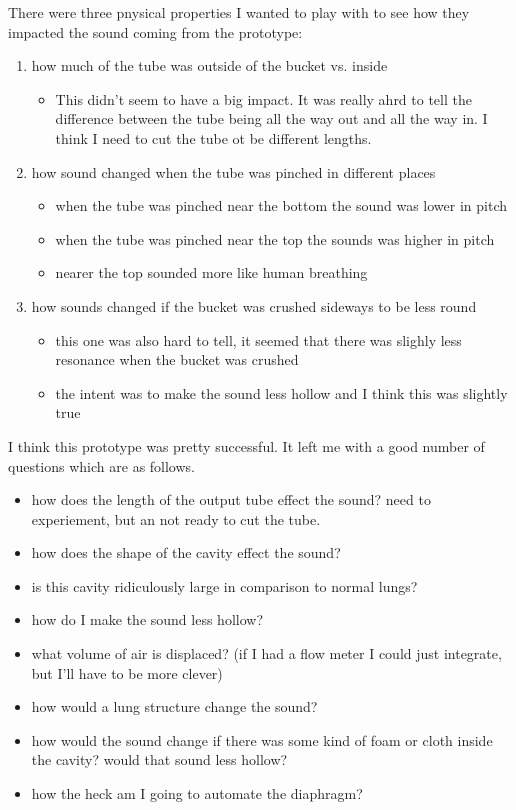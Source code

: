 \documentclass[11pt]{report}
\begin{document}
There were three pnysical properties I wanted to play with to see how they impacted the sound coming from the prototype:
\begin{enumerate}
\item
how much of the tube was outside of the bucket vs. inside
\begin{itemize}
\item
This didn't seem to have a big impact. It was really ahrd to tell the difference between the tube being all the way out and all the way in. I think I need to cut the tube ot be different lengths.
\end{itemize}
\item
how sound changed when the tube was pinched in different places
\begin{itemize}
  \item
    when the tube was pinched near the bottom the sound was lower in pitch
  \item
    when the tube was pinched near the top the sounds was higher in pitch
  \item
    nearer the top sounded more like human breathing
\end{itemize}
\item
how sounds changed if the bucket was crushed sideways to be less round
\begin{itemize}
  \item
    this one was also hard to tell, it seemed that there was slighly less resonance when the bucket was crushed
  \item
    the intent was to make the sound less hollow and I think this was slightly true
\end{itemize}

\end{enumerate}

\vspace{1cm}
I think this prototype was pretty successful. It left me with a good number of questions which are as follows.
\begin{itemize}
\item
  how does the length of the output tube effect the sound? need to experiement, but an not ready to cut the tube.
\item
  how does the shape of the cavity effect the sound?
\item
  is this cavity ridiculously large in comparison to normal lungs?
\item
  how do I make the sound less hollow?
\item
  what volume of air is displaced? (if I had a flow meter I could just integrate, but I'll have to be more clever)
\item
  how would a lung structure change the sound?
\item
  how would the sound change if there was some kind of foam or cloth inside the cavity? would that sound less hollow?
\item
  how the heck am I going to automate the diaphragm?
\end{itemize}
\end{document}
